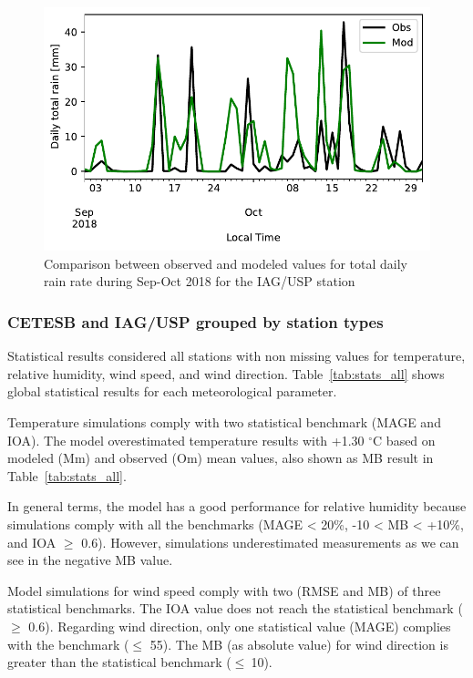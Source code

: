 \begin{figure}[!hbt]
	\centering
  \includegraphics[width=.8\textwidth]{fig/iag_daily_rain}
  \caption{Comparison between observed and modeled values for total daily rain rate during Sep-Oct 2018 for the IAG/USP station}
  \label{fig:iag_daily_rain}
\end{figure}

\subsubsection{CETESB and IAG/USP grouped by station types}
Statistical results considered all stations with non missing values for temperature, relative humidity, wind speed, and wind direction.
Table~\ref{tab:stats_all} shows global statistical results for each meteorological parameter.



Temperature simulations comply with two statistical benchmark (MAGE and IOA).
The model overestimated temperature results with +1.30 $^{\circ}$C based on modeled (Mm) and observed (Om) mean values, also shown as MB result in Table~\ref{tab:stats_all}.

In general terms, the model has a good performance for relative humidity because simulations comply with all the benchmarks (MAGE < 20\%, -10 < MB <  +10\%, and IOA $\geq$ 0.6).
However, simulations underestimated measurements as we can see in the negative MB value.

Model simulations for wind speed comply with two (RMSE and MB) of three statistical benchmarks.
The IOA value does not reach the statistical benchmark ($\geq$ 0.6).
Regarding wind direction, only one statistical value (MAGE) complies with the benchmark ($\leq$ 55).
The MB (as absolute value) for wind direction is greater than the statistical benchmark ($\leq~$10).

